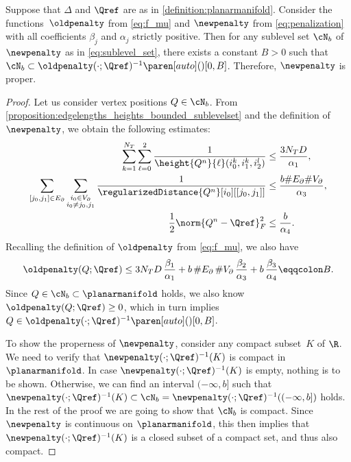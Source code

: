 \begin{theorem}
	\label{theorem:phiProper}
	Suppose that $\Delta$ and $\Qref$ are as in \cref{definition:planarmanifold}.
	Consider the functions~$\oldpenalty$ from \eqref{eq:f_mu} and $\newpenalty$ from \eqref{eq:penalization} with all coefficients $\beta_j$ and $\alpha_j$ strictly positive.
	Then for any sublevel set $\cN_b$ of $\newpenalty$ as in \eqref{eq:sublevel_set}, there exists a constant $B > 0$ such that $\cN_b \subset \oldpenalty(\cdot;\Qref)^{-1}\paren[auto](){[0,B]}$.
	Therefore, $\newpenalty$ is proper.
\end{theorem}
\begin{proof}
	Let us consider vertex positions $Q \in \cN_b$.
	From \cref{proposition:edgelengths_heights_bounded_sublevelset} and the definition of $\newpenalty$, we obtain the following estimates:
	\begin{align*}
		\sum_{k=1}^{N_T} \sum_{\ell = 0}^2 \frac{1}{\height{Q^n}{\ell}(i_0^k,i_1^k,i_2^l)}
		&
		\le
		\frac{3N_TD}{\alpha_1}
		,
		\\
		\sum_{[j_0,j_1] \in E_\partial}
		\sum_{\substack{i_0 \in V_\partial \\ i_0 \neq j_0,j_1}} \frac{1}{\regularizedDistance{Q^n}[i_0][[j_0,j_1]]}
		&
		\le
		\frac{b\#E_\partial \#V_\partial}{\alpha_3}
		,
		\\
		\frac{1}{2} \norm{Q^n-\Qref}_F^2
		&
		\le
		\frac{b}{\alpha_4}
		.
	\end{align*}
	Recalling the definition of $\oldpenalty$ from \eqref{eq:f_mu}, we also have
	\begin{equation*}
		\oldpenalty(Q;\Qref)
		\le
		3 N_T D \, \frac{\beta_1}{\alpha_1}
		+ b \, \#E_\partial \, \#V_\partial \, \frac{\beta_2}{\alpha_3}
		+ b \, \frac{\beta_3}{\alpha_4}
		\eqqcolon
		B
		.
	\end{equation*}
	Since $Q \in \cN_b \subset \planarmanifold$ holds, we also know $\oldpenalty(Q;\Qref) \ge 0$, which in turn implies $Q \in \oldpenalty(\cdot;\Qref)^{-1}\paren[auto](){[0,B]}$.

	To show the properness of $\newpenalty$, consider any compact subset~$K$ of $\R$.
	We need to verify that $\newpenalty(\cdot;\Qref)^{-1}(K)$ is compact in $\planarmanifold$.
	In case $\newpenalty(\cdot;\Qref)^{-1}(K)$ is empty, nothing is to be shown.
	Otherwise, we can find an interval $(-\infty,b]$ such that $\newpenalty(\cdot;\Qref)^{-1}(K) \subset \cN_b = \newpenalty(\cdot;\Qref)^{-1}((-\infty,b])$ holds.
	In the rest of the proof we are going to show that $\cN_b$ is compact.
	Since $\newpenalty$ is continuous on $\planarmanifold$, this then implies that $\newpenalty(\cdot;\Qref)^{-1}(K)$ is a closed subset of a compact set, and thus also compact.


\end{proof}
